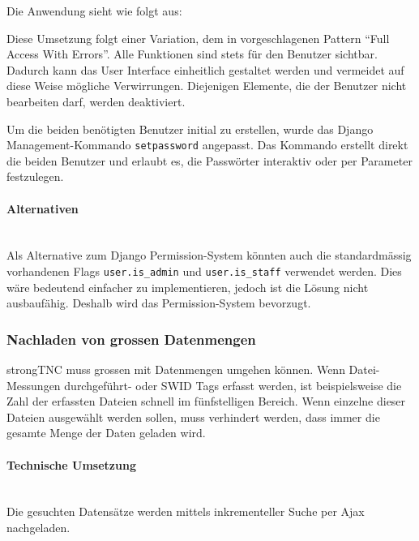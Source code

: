 Die Anwendung sieht wie folgt aus:


Diese Umsetzung folgt einer Variation, dem in \cite{posa1} vorgeschlagenen Pattern \enquote{Full Access With Errors}. Alle Funktionen sind stets für den Benutzer sichtbar. Dadurch kann das User Interface einheitlich gestaltet werden und vermeidet auf diese Weise mögliche Verwirrungen. Diejenigen Elemente, die der Benutzer nicht bearbeiten darf, werden deaktiviert. 

Um die beiden benötigten Benutzer initial zu erstellen, wurde das Django
Management-Kommando \texttt{setpassword} angepasst. Das Kommando erstellt direkt
die beiden Benutzer und erlaubt es, die Passwörter interaktiv oder per Parameter
festzulegen.

\paragraph{Alternativen} \hspace{0px} \\
Als Alternative zum Django Permission-System könnten auch die standardmässig
vorhandenen Flags \texttt{user.is\_admin} und \texttt{user.is\_staff} verwendet
werden. Dies wäre bedeutend einfacher zu implementieren, jedoch ist die Lösung
nicht ausbaufähig. Deshalb wird das Permission-System bevorzugt.

\subsubsection{Nachladen von grossen Datenmengen}
strongTNC muss grossen mit Datenmengen umgehen können. Wenn Datei-Messungen
durchgeführt- oder SWID Tags erfasst werden, ist beispielsweise die Zahl der
erfassten Dateien schnell im fünfstelligen Bereich. Wenn einzelne dieser Dateien
ausgewählt werden sollen, muss verhindert werden, dass immer die gesamte Menge
der Daten geladen wird.

\paragraph{Technische Umsetzung} \hspace{0pt} \\
Die gesuchten Datensätze werden mittels inkrementeller Suche per Ajax
nachgeladen.

